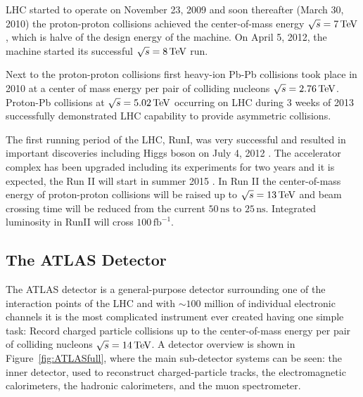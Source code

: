 LHC started to operate on November 23, 2009 and soon thereafter (March 30, 2010)
the proton-proton collisions achieved the center-of-mass energy $\sqrt{s} = 7
\,\text{TeV}$, which is halve of the design energy of the machine. On April 5, 2012, the
machine started its successful $\sqrt{s} = 8 \,\text{TeV}$ run.

Next to the proton-proton collisions first heavy-ion Pb-Pb collisions took place
in 2010 at a center of mass energy per pair of colliding nucleons $\sqrt{s} =
2.76 \,\text{TeV}$. Proton-Pb collisions at $\sqrt{s} = 5.02 \,\text{TeV}$ occurring on LHC
during 3 weeks of 2013 successfully demonstrated LHC capability to provide
asymmetric collisions.  

The first running period of the LHC, RunI, was very successful and resulted in
important discoveries including Higgs boson on July 4, 2012
\cite{HiggsDiscovery}.  The accelerator complex has been upgraded including its
experiments for two years and it is expected, the Run II will start in summer
2015 \cite{LHCFuture, LHCFutureLuminosigy}. In Run II the center-of-mass energy of proton-proton
collisions will be raised up to $\sqrt{s} = 13 \,\text{TeV}$ and beam crossing time will
be reduced from the current $50\,\text{ns}$ to $25\,\text{ns}$. Integrated
luminosity in RunII will cross $100\,\text{fb}^{-1}$.

\subsection{The ATLAS Detector}

The ATLAS detector \cite{ATLAS} is a general-purpose detector surrounding one of
the interaction points of the LHC and with $\sim 100$ million of individual
electronic channels it is the most complicated instrument ever created having
one simple task: Record charged particle collisions up to the center-of-mass
energy per pair of colliding nucleons $\sqrt{s} = 14 \,\text{TeV}$. A detector overview is
shown in Figure~\ref{fig:ATLASfull}, where the main sub-detector systems can be
seen: the inner detector, used to reconstruct charged-particle tracks, the
electromagnetic calorimeters, the hadronic calorimeters, and the muon
spectrometer. 


